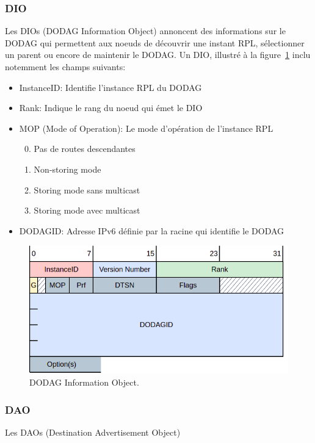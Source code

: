 \subsubsection*{DIO}
    Les DIOs (DODAG Information Object) annoncent des informations sur le DODAG qui permettent aux noeuds de découvrir une instant RPL, sélectionner un parent ou encore de maintenir le DODAG.
    Un DIO, illustré à la figure~\ref{fig:state-dio} inclu notemment les champs suivants:
    \begin{itemize}
        \item InstanceID: Identifie l'instance RPL du DODAG
        \item Rank: Indique le rang du noeud qui émet le DIO
        \item MOP (Mode of Operation): Le mode d'opération de l'instance RPL 
        \begin{enumerate}
            \setcounter{enumi}{-1}
            \item Pas de routes descendantes
            \item Non-storing mode
            \item Storing mode sans multicast
            \item Storing mode avec multicast
        \end{enumerate}
        \item DODAGID: Adresse IPv6 définie par la racine qui identifie le DODAG
    \end{itemize}
    \begin{figure}
        \centering
        \includegraphics[scale=0.5]{res/dio.drawio.png}
        \caption{DODAG Information Object.}
        \label{fig:state-dio}
    \end{figure}

\subsubsection*{DAO}
    Les DAOs (Destination Advertisement Object)

